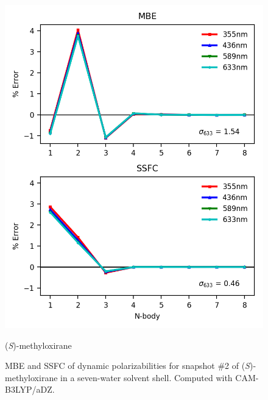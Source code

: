     \begin{figure}
            \centering
            \includegraphics[scale=0.75]{p1/graphs/metox2_7_pol.png}
            \caption{(\textit{S})-methyloxirane}
        \caption{MBE and SSFC of dynamic polarizabilities for
          snapshot \#2 of (\textit{S})-methyloxirane in a seven-water solvent shell. Computed with CAM-B3LYP/aDZ.}
            \label{metox2_pol}
    \end{figure}
